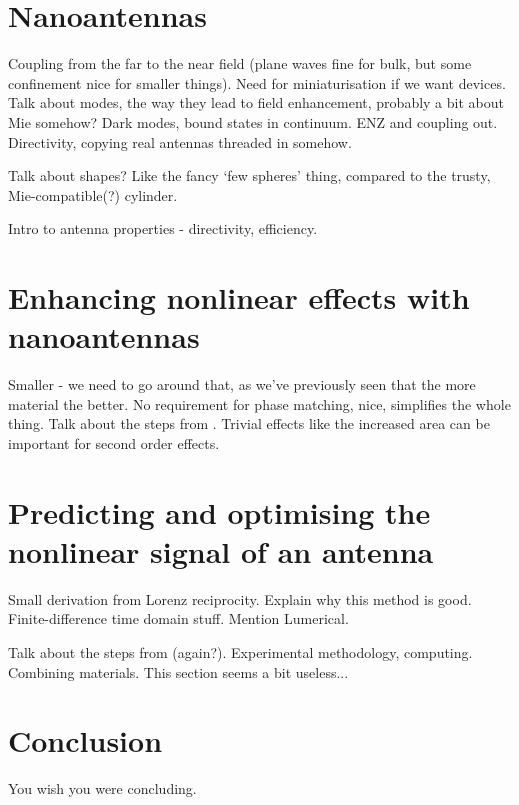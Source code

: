 \documentclass[12pt,a4paper]{article}
\begin{document}
\section{Nanoantennas}
Coupling from the far to the near field (plane waves fine for bulk, but some confinement nice for smaller things). Need for miniaturisation if we want devices. Talk about modes, the way they lead to field enhancement, probably a bit about Mie somehow? Dark modes, bound states in continuum. ENZ and coupling out. Directivity, copying real antennas threaded in somehow.

Talk about shapes? Like the fancy `few spheres' thing, compared to the trusty, Mie-compatible(?) cylinder.

Intro to antenna properties - directivity, efficiency.

\section{Enhancing nonlinear effects with nanoantennas}
Smaller - we need to go around that, as we've previously seen that the more material the better. No requirement for phase matching, nice, simplifies the whole thing. Talk about the steps from \cite{koshelevSubwavelengthDielectricResonators2020}. Trivial effects like the increased area can be important for second order effects.

\section{Predicting and optimising the nonlinear signal of an antenna}
Small derivation from Lorenz reciprocity. Explain why this method is good. Finite-difference time domain stuff. Mention Lumerical.

Talk about the steps from \cite{koshelevSubwavelengthDielectricResonators2020} (again?). Experimental methodology, computing. Combining materials. This section seems a bit useless...

\section{Conclusion}
You wish you were concluding\cite{aluTheoryModelingFeatures2013}.



\end{document}
